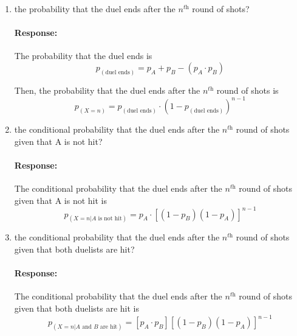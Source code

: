 \documentclass [11pt] {article}
\newenvironment{response}{\vspace{-10pt}\paragraph{Response:}}{}
\renewcommand{\it}[1]{\textit{{#1}}}
\begin{document}
\begin{enumerate}
\begin{enumerate}
\begin{enumerate}[itemsep=10pt]
                    \item the probability that the duel ends after the $n^{\it{th}}$ round of shots?
                        \begin{response}
                            The probability that the duel ends is
                            \vspace{-5pt}
                            \[p_{(\text{duel ends})} = p_A + p_B - \left( p_A \cdot p_B \right)\]
                            \vspace{-15pt}

                            Then, the probability that the duel ends after the $n^{\it{th}}$ round of 
                            shots is 
                            \vspace{-5pt}
                            \[p_{(X = n)} = p_{(\text{duel ends})} \cdot \left(1 - p_{(\text{duel ends})} \right)^{n - 1}\]
                        \end{response}

                    \item the conditional probability that the duel ends after the $n^{\it{th}}$ 
                        round of shots given that A is not hit?
                        \begin{response}
                            The conditional probability that the duel ends after the $n^{\it{th}}$ 
                            round of shots given that A is not hit is
                            \vspace{-5pt}
                            \[p_{(X = n | A \text{ is not hit})} = p_A \cdot \left[ \left( 1 - p_B \right) \left( 1 - p_A \right) \right]^{n - 1}\]
                        \end{response}

                    \item the conditional probability that the duel ends after the $n^{\it{th}}$ 
                        round of shots given that both duelists are hit?
                        \begin{response}
                            The conditional probability that the duel ends after the $n^{\it{th}}$ 
                            round of shots given that both duelists are hit is
                            \vspace{-5pt}
                            \[p_{(X = n | A \text{ and } B \text{ are hit})} = \left[ p_A \cdot p_B \right] \left[ \left( 1 - p_B \right) \left( 1 - p_A \right) \right]^{n - 1}\]
                        \end{response}
                \end{enumerate}


\end{enumerate}
\end{enumerate}
\end{document}
